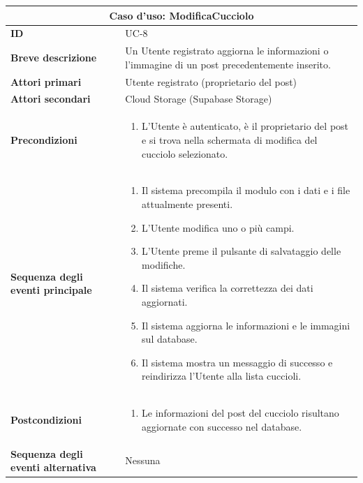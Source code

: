 \documentclass[a4paper]{report}
\begin{document}
\begin{table}[H]
\vspace*{-0cm}
\renewcommand{\arraystretch}{1.9}
\begin{tabular}{|p{3.9cm}|p{9.9cm}|}
\hline
\multicolumn{2}{|c|}{\textbf{Caso d’uso: ModificaCucciolo}} \\ \hline
\textbf{ID} & UC-8 \\ \hline
\textbf{Breve descrizione} & Un Utente registrato aggiorna le informazioni o l’immagine di un post precedentemente inserito. \\ \hline
\textbf{Attori primari} & Utente registrato (proprietario del post) \\ \hline
\textbf{Attori secondari} & Cloud Storage (Supabase Storage)
 \\ \hline
\textbf{Precondizioni} & \begin{enumerate}[leftmargin=14pt,label=\arabic*.,labelsep=0.5em,topsep=0pt,partopsep=0pt,parsep=0pt,itemsep=0pt]
   \item L'Utente è autenticato, è il proprietario del post e si trova nella schermata di modifica del cucciolo selezionato.
\end{enumerate} \\ \hline
\textbf{Sequenza degli eventi principale} &
\begin{enumerate}[leftmargin=14pt,label=\arabic*.,labelsep=0.5em,topsep=0pt,partopsep=0pt,parsep=0pt,itemsep=0pt]
  \item Il sistema precompila il modulo con i dati e i file attualmente presenti.
  \item L'Utente modifica uno o più campi.
  \item L'Utente preme il pulsante di salvataggio delle modifiche.
  \item Il sistema verifica la correttezza dei dati aggiornati.
  \item Il sistema aggiorna le informazioni e le immagini sul database.
  \item Il sistema mostra un messaggio di successo e reindirizza l'Utente alla lista cuccioli.
\end{enumerate}\\ \hline
\textbf{Postcondizioni} &
\begin{enumerate}[leftmargin=14pt,label=\arabic*.,labelsep=0.5em,topsep=0pt,partopsep=0pt,parsep=0pt,itemsep=0pt]
\item Le informazioni del post del cucciolo risultano aggiornate con successo nel database.
\end{enumerate} \\ \hline
\textbf{Sequenza degli eventi alternativa} & Nessuna \\ \hline
\end{tabular}
\end{table}
\end{document}
